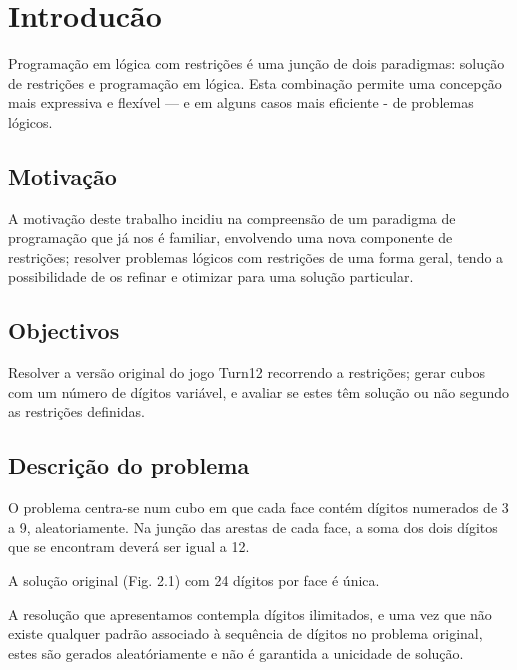 %
%

\chapter{Introducão}
\label{introduction} %

Programação em lógica com restrições é uma junção de dois paradigmas: solução de restrições e programação em lógica. Esta combinação permite uma concepção mais expressiva e flexível — e em alguns casos mais eficiente - de problemas lógicos.

\section{Motivação}
\label{sec:1}
A motivação deste trabalho incidiu na compreensão de um paradigma de programação que já nos é familiar, envolvendo uma nova componente de restrições; resolver problemas lógicos com restrições de uma forma geral, tendo a possibilidade de os refinar e otimizar para uma solução particular.

\section{Objectivos}
\label{sec:2}
Resolver a versão original do jogo Turn12 recorrendo a restrições; gerar cubos com um número de dígitos variável, e avaliar se estes têm solução ou não segundo as restrições definidas.

\section{Descrição do problema}
\label{sec:3}
O problema centra-se num cubo em que cada face contém dígitos numerados de 3 a 9, aleatoriamente. Na junção das arestas de cada face, a soma dos dois dígitos que se encontram deverá ser igual a 12.

A solução original (Fig. 2.1) com 24 dígitos por face é única.

A resolução que apresentamos contempla dígitos ilimitados, e uma vez que não existe qualquer padrão associado à sequência de dígitos no problema original, estes são gerados aleatóriamente e não é garantida a unicidade de solução.

